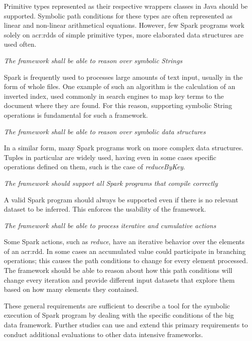 \begin{itemize}
Primitive types represented as their respective wrappers classes in Java should be supported. Symbolic path conditions for these types are often represented as linear and non-linear arithmetical equations. However, few Spark programs work solely on \acrshort{acr:rdd}s of simple primitive types, more elaborated data structures are used often.
	
 \textit{The framework shall be able to reason over symbolic Strings}

Spark is frequently used to processes large amounts of text input, usually in the form of whole files. One example of such an algorithm is the calculation of an inverted index, used commonly in search engines to map key terms to the document where they are found. For this reason, supporting symbolic String operations is fundamental for such a framework.
	
 \textit{The framework shall be able to reason over symbolic data structures}

In a similar form, many Spark programs work on more complex data structures. Tuples in particular are widely used, having even in some cases specific operations defined on them, such is the case of \textit{reduceByKey}.
	
 \textit{The framework should support all Spark programs that compile correctly}

A valid Spark program should always be supported even if there is no relevant dataset to be inferred. This enforces the usability of the framework.
	
 \textit{The framework shall be able to process iterative and cumulative actions}

Some Spark actions, such as \textit{reduce}, have an iterative behavior over the elements of an \acrshort{acr:rdd}. In some cases an accumulated value could participate in branching operations; this causes the path conditions to change for every element processed. The framework should be able to reason about how this path conditions will change every iteration and provide different input datasets that explore them based on how many elements they contained.

\end{itemize}

These general requirements are sufficient to describe a tool for the symbolic execution of Spark program by dealing with the specific conditions of the big data framework. Further studies can use and extend this primary requirements to conduct additional evaluations to other data intensive frameworks. 

